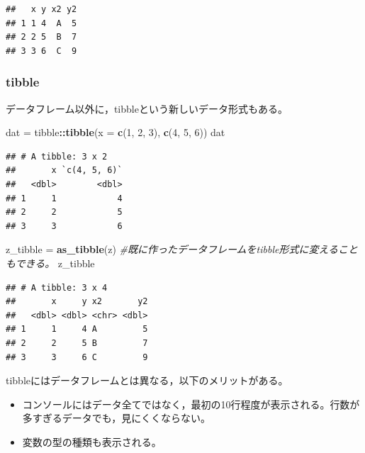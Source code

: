 \documentclass[]{article}
\newenvironment{Shaded}{\begin{snugshade}}{\end{snugshade}}
\newcommand{\KeywordTok}[1]{\textcolor[rgb]{0.13,0.29,0.53}{\textbf{#1}}}
\newcommand{\DataTypeTok}[1]{\textcolor[rgb]{0.13,0.29,0.53}{#1}}
\newcommand{\DecValTok}[1]{\textcolor[rgb]{0.00,0.00,0.81}{#1}}
\newcommand{\StringTok}[1]{\textcolor[rgb]{0.31,0.60,0.02}{#1}}
\newcommand{\CommentTok}[1]{\textcolor[rgb]{0.56,0.35,0.01}{\textit{#1}}}
\newcommand{\OperatorTok}[1]{\textcolor[rgb]{0.81,0.36,0.00}{\textbf{#1}}}
\newcommand{\NormalTok}[1]{#1}
\providecommand{\tightlist}{%
  \setlength{\itemsep}{0pt}\setlength{\parskip}{0pt}}
\begin{document}
\begin{verbatim}
##   x y x2 y2
## 1 1 4  A  5
## 2 2 5  B  7
## 3 3 6  C  9
\end{verbatim}

\subsubsection{tibble}\label{tibble}

データフレーム以外に，tibbleという新しいデータ形式もある。

\begin{Shaded}
\begin{Highlighting}[]
\NormalTok{dat =}\StringTok{ }\NormalTok{tibble}\OperatorTok{::}\KeywordTok{tibble}\NormalTok{(}\DataTypeTok{x =} \KeywordTok{c}\NormalTok{(}\DecValTok{1}\NormalTok{, }\DecValTok{2}\NormalTok{, }\DecValTok{3}\NormalTok{), }\KeywordTok{c}\NormalTok{(}\DecValTok{4}\NormalTok{, }\DecValTok{5}\NormalTok{, }\DecValTok{6}\NormalTok{))}
\NormalTok{dat}
\end{Highlighting}
\end{Shaded}

\begin{verbatim}
## # A tibble: 3 x 2
##       x `c(4, 5, 6)`
##   <dbl>        <dbl>
## 1     1            4
## 2     2            5
## 3     3            6
\end{verbatim}

\begin{Shaded}
\begin{Highlighting}[]
\NormalTok{z_tibble =}\StringTok{ }\KeywordTok{as_tibble}\NormalTok{(z) }\CommentTok{#既に作ったデータフレームをtibble形式に変えることもできる。}
\NormalTok{z_tibble}
\end{Highlighting}
\end{Shaded}

\begin{verbatim}
## # A tibble: 3 x 4
##       x     y x2       y2
##   <dbl> <dbl> <chr> <dbl>
## 1     1     4 A         5
## 2     2     5 B         7
## 3     3     6 C         9
\end{verbatim}

tibbleにはデータフレームとは異なる，以下のメリットがある。

\begin{itemize}
\tightlist
\item
  コンソールにはデータ全てではなく，最初の10行程度が表示される。行数が多すぎるデータでも，見にくくならない。
\item
  変数の型の種類も表示される。
\end{itemize}
\end{document}
